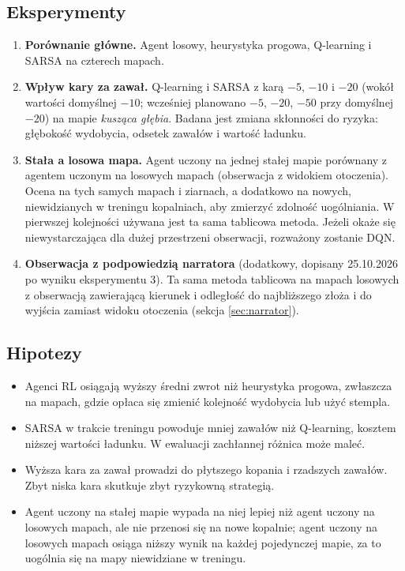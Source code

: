 \documentclass[11pt,a4paper]{article}
\begin{document}
\subsection{Eksperymenty}
\begin{enumerate}
  \item \textbf{Porównanie główne.} Agent losowy, heurystyka progowa, Q-learning
  i SARSA na czterech mapach.
  \item \textbf{Wpływ kary za zawał.} Q-learning i SARSA z karą $-5$, $-10$
  i $-20$ (wokół wartości domyślnej $-10$; wcześniej planowano $-5$, $-20$, $-50$
  przy domyślnej $-20$) na mapie \emph{kusząca głębia}. Badana jest zmiana
  skłonności do ryzyka: głębokość wydobycia, odsetek zawałów i wartość ładunku.
  \item \textbf{Stała a losowa mapa.} Agent uczony na jednej stałej mapie
  porównany z agentem uczonym na losowych mapach (obserwacja z widokiem
  otoczenia). Ocena na tych samych mapach i ziarnach, a dodatkowo na nowych,
  niewidzianych w treningu kopalniach, aby zmierzyć zdolność uogólniania.
  W pierwszej kolejności używana jest ta sama tablicowa metoda. Jeżeli okaże się
  niewystarczająca dla dużej przestrzeni obserwacji, rozważony zostanie DQN.
  \item \textbf{Obserwacja z podpowiedzią narratora} (dodatkowy, dopisany
  25.10.2026 po wyniku eksperymentu 3). Ta sama metoda tablicowa na mapach losowych
  z obserwacją zawierającą kierunek i odległość do najbliższego złoża i do wyjścia
  zamiast widoku otoczenia (sekcja \ref{sec:narrator}).
\end{enumerate}

\subsection{Hipotezy}
\begin{itemize}
  \item[H1.] Agenci RL osiągają wyższy średni zwrot niż heurystyka progowa,
  zwłaszcza na mapach, gdzie opłaca się zmienić kolejność wydobycia lub użyć stempla.
  \item[H2.] SARSA w trakcie treningu powoduje mniej zawałów niż Q-learning,
  kosztem niższej wartości ładunku. W ewaluacji zachłannej różnica może maleć.
  \item[H3.] Wyższa kara za zawał prowadzi do płytszego kopania i rzadszych
  zawałów. Zbyt niska kara skutkuje zbyt ryzykowną strategią.
  \item[H4.] Agent uczony na stałej mapie wypada na niej lepiej niż agent uczony
  na losowych mapach, ale nie przenosi się na nowe kopalnie; agent uczony na
  losowych mapach osiąga niższy wynik na każdej pojedynczej mapie, za to
  uogólnia się na mapy niewidziane w treningu.
\end{itemize}
\end{document}
